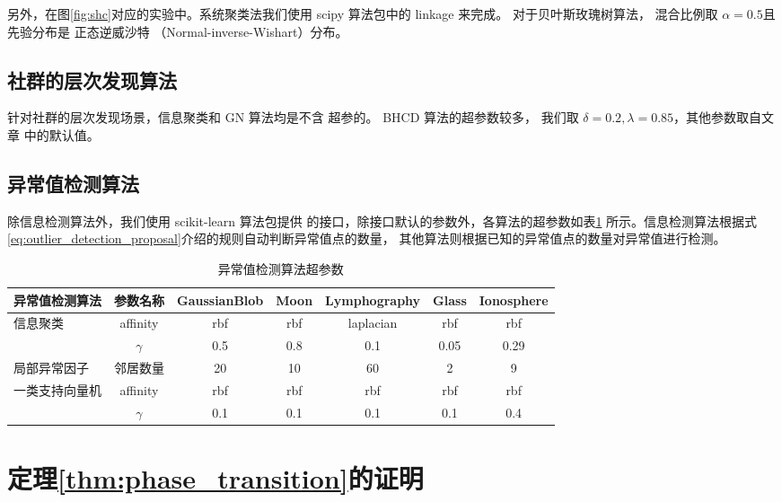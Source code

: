 另外，在图\ref{fig:shc}对应的实验中。系统聚类法我们使用 scipy 算法包中的 linkage 来完成。
对于贝叶斯玫瑰树算法，
混合比例取 $\alpha=0.5$且先验分布是
正态逆威沙特 （Normal-inverse-Wishart）分布。

\subsection{社群的层次发现算法}
针对社群的层次发现场景，信息聚类和 GN 算法均是不含
超参的。
BHCD 算法的超参数较多，
我们取 $\delta=0.2, \lambda=0.85$，其他参数取自文章\citet{RN23}
中的默认值。
\subsection{异常值检测算法}
除信息检测算法外，我们使用 scikit-learn 算法包提供
的接口，除接口默认的参数外，各算法的超参数如表\ref{tab:outlier_detection_alg_hyperparameter}
所示。信息检测算法根据式\ref{eq:outlier_detection_proposal}介绍的规则自动判断异常值点的数量，
其他算法则根据已知的异常值点的数量对异常值进行检测。

\begin{table}[!ht]
  \begin{adjustbox}{width=\columnwidth,center}
  \begin{tabular}{|l|c|c|c|c|c|c|}
  \hline
   异常值检测算法  &   参数名称 &
   GaussianBlob &  Moon &  Lymphography &   Glass &   Ionosphere \\
  \hline
   \multirow{2}{*}{信息聚类}  & affinity
   & rbf & rbf & laplacian
   & rbf & rbf \\
   \cline{2-7}
   & $\gamma$ & 0.5 & 0.8 & 0.1 & 0.05 & 0.29 \\
   \hline
   局部异常因子  &  
   邻居数量 & 20 &  10
   &  60
   & 2 &   9 \\
   \hline
   \multirow{2}{*}{一类支持向量机}  & 
   affinity & rbf &  rbf
   & rbf
   & rbf & rbf \\
   \cline{2-7}
   & $\gamma$ & 0.1 & 0.1 & 0.1 & 0.1 & 0.4\\
  \hline
  \end{tabular}
\end{adjustbox}
\caption{异常值检测算法超参数}\label{tab:outlier_detection_alg_hyperparameter}
\end{table}


\section{定理\ref{thm:phase_transition}的证明}
\label{sec:appendix_theorem_proof_phase_trans}

